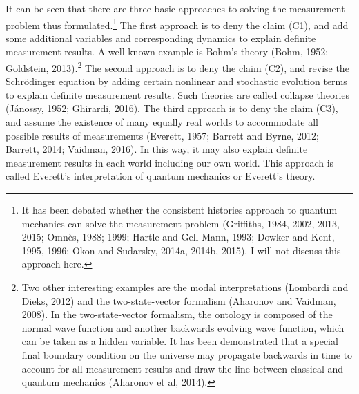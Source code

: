 It can be seen that there are three basic approaches to solving the measurement problem thus formulated.\footnote{It has been debated whether the consistent histories approach to quantum mechanics can solve the measurement problem (Griffiths, 1984, 2002, 2013, 2015; Omn\`{e}s, 1988; 1999;  Hartle and Gell-Mann, 1993; Dowker and Kent, 1995, 1996; Okon and Sudarsky, 2014a, 2014b, 2015). I will not discuss this approach here.} 
The first approach is to deny the claim (C1), and add some additional variables and corresponding dynamics to explain definite measurement results. A well-known example is Bohm's theory (Bohm, 1952; Goldstein, 2013).\footnote{Two other interesting examples are the modal interpretations (Lombardi and Dieks, 2012) and the two-state-vector formalism (Aharonov and Vaidman, 2008). In the two-state-vector formalism, the ontology is composed of the normal wave function and another backwards evolving wave function, which can be taken as a hidden variable. It has been demonstrated that a special final boundary condition on the universe may propagate backwards in time to account for all measurement results and draw the line between classical and quantum mechanics (Aharonov et al, 2014).}
The second approach is to deny the claim (C2), and revise the Schr\"{o}dinger equation by adding certain nonlinear and stochastic evolution terms to explain definite measurement results. Such theories are called collapse theories (J\'{a}nossy, 1952; Ghirardi, 2016).
The third approach is to deny the claim (C3), and assume the existence of many equally real worlds to accommodate all possible results of measurements (Everett, 1957; Barrett and Byrne, 2012; Barrett, 2014; Vaidman, 2016). In this way, it may also explain definite measurement results in each world including our own world. This approach is called Everett's interpretation of quantum mechanics or Everett's theory.
